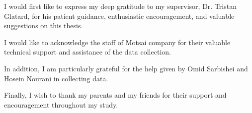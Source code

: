 \begin{acknowledgments}
I would first like to express my deep gratitude to my supervisor, Dr. Tristan
Glatard, for his patient guidance, enthusiastic encouragement, and valuable
suggestions on this thesis.
  
I would like to acknowledge the staff of Motsai company for their valuable
technical support and assistance of the data collection.
  
In addition, I am particularly grateful for the help given by Omid Sarbishei and
Hosein Nourani in collecting data.
  
Finally, I wish to thank my parents and my friends for their support and
encouragement throughout my study.

\end{acknowledgments}
